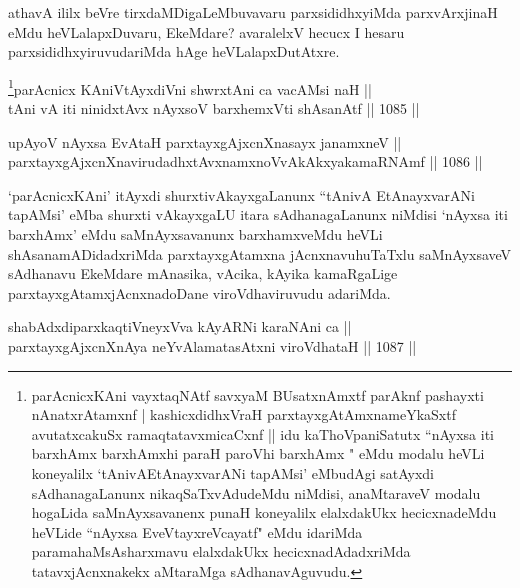 \begin{artha}
athavA ililx beVre tirxdaMDigaLeMbuvavaru parxsididhxyiMda parxvArxjinaH eMdu heVLalapxDuvaru, EkeMdare? avaralelxV hecucx I hesaru parxsididhxyiruvudariMda hAge heVLalapxDutAtxre.
\end{artha}



\begin{shl}
\footnote{parAcnicxKAni vayxtaqNAtf savxyaM BUsatxnAmxtf parAknf pashayxti nAnatxrAtamxnf | kashicxdidhxVraH parxtayxgAtAmxnameYkaSxtf avutatxcakuSx ramaqtatavxmicaCxnf ||  idu kaThoVpaniSatutx ``nAyxsa iti barxhAmx barxhAmxhi paraH paroVhi barxhAmx " eMdu modalu heVLi koneyalilx `tAnivAEtAnayxvarANi tapAMsi' eMbudAgi satAyxdi sAdhanagaLanunx nikaqSaTxvAdudeMdu niMdisi, anaMtaraveV modalu hogaLida saMnAyxsavanenx punaH koneyalilx elalxdakUkx hecicxnadeMdu heVLide ``nAyxsa EveVtayxreVcayatf" eMdu idariMda paramahaMsAsharxmavu elalxdakUkx hecicxnadAdadxriMda tatavxjAcnxnakekx aMtaraMga sAdhanavAguvudu.}parAcnicx KAniVtAyxdiVni shwrxtAni ca vacAMsi naH || \\
tAni vA iti ninidxtAvx nAyxsoV barxhemxVti shAsanAtf \hfill || 1085 ||  
\end{shl}
				
\begin{shl}
upAyoV nAyxsa EvAtaH parxtayxgAjxcnXnasayx janamxneV || \\
parxtayxgAjxcnXnavirudadhxtAvxnamxnoVvAkAkxyakamaRNAmf \hfill || 1086 ||  
\end{shl}

\begin{artha}
`parAcnicxKAni' itAyxdi shurxtivAkayxgaLanunx ``tAnivA EtAnayxvarANi tapAMsi' eMba shurxti vAkayxgaLU itara sAdhanagaLanunx niMdisi `nAyxsa iti barxhAmx' eMdu saMnAyxsavanunx barxhamxveMdu heVLi shAsanamADidadxriMda parxtayxgAtamxna jAcnxnavuhuTaTxlu saMnAyxsaveV sAdhanavu EkeMdare mAnasika, vAcika, kAyika kamaRgaLige parxtayxgAtamxjAcnxnadoDane viroVdhaviruvudu adariMda.
\end{artha}


\begin{shl}
shabAdxdiparxkaqtiVneyxVva kAyARNi karaNAni ca || \\
parxtayxgAjxcnXnAya neYvAlamatasAtxni viroVdhataH \hfill || 1087 ||  
\end{shl}	

